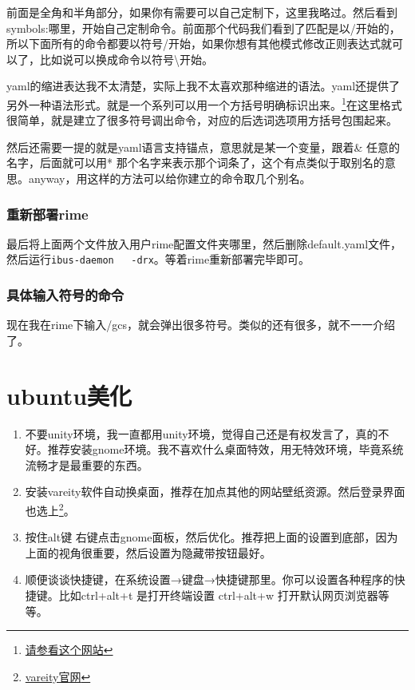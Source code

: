 \documentclass[12pt,oneside]{book}
\begin{document}
\begin{common-format}
前面是全角和半角部分，如果你有需要可以自己定制下，这里我略过。然后看到symbols:哪里，开始自己定制命令。前面那个代码我们看到了匹配是以/开始的，所以下面所有的命令都要以符号/开始，如果你想有其他模式修改正则表达式就可以了，比如说可以换成命令以符号\textbackslash 开始。

yaml的缩进表达我不太清楚，实际上我不太喜欢那种缩进的语法。yaml还提供了另外一种语法形式。就是一个系列可以用一个方括号明确标识出来。\footnote{\href{http://www.dev.idv.tw/mediawiki/index.php/YAML}{请参看这个网站}}在这里格式很简单，就是建立了很多符号调出命令，对应的后选词选项用方括号包围起来。

然后还需要一提的就是yaml语言支持锚点，意思就是某一个变量，跟着\& 任意的名字，后面就可以用* 那个名字来表示那个词条了，这个有点类似于取别名的意思。anyway，用这样的方法可以给你建立的命令取几个别名。

\subsubsection{重新部署rime}
最后将上面两个文件放入用户rime配置文件夹哪里，然后删除default.yaml文件，然后运行\verb+ibus-daemon   -drx+。等着rime重新部署完毕即可。

\subsubsection{具体输入符号的命令}
现在我在rime下输入/gcs，就会弹出很多符号。类似的还有很多，就不一一介绍了。


\section{ubuntu美化}
\begin{enumerate}
\item 不要unity环境，我一直都用unity环境，觉得自己还是有权发言了，真的不好。推荐安装gnome环境。我不喜欢什么桌面特效，用无特效环境，毕竟系统流畅才是最重要的东西。
\item 安装vareity软件自动换桌面，推荐在加点其他的网站壁纸资源。然后登录界面也选上\footnote{\href{http://peterlevi.com/variety/}{vareity官网}}。
\item 按住alt键 右键点击gnome面板，然后优化。推荐把上面的设置到底部，因为上面的视角很重要，然后设置为隐藏带按钮最好。
\item 顺便谈谈快捷键，在系统设置→键盘→快捷键那里。你可以设置各种程序的快捷键。比如ctrl+alt+t 是打开终端设置 ctrl+alt+w 打开默认网页浏览器等等。
\end{enumerate}


\end{common-format}
\end{document}
